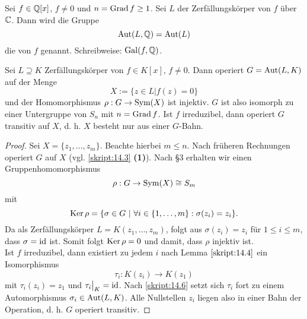 \begin{df}\label{skript:14.7}
	Sei $f\in\mathbb{Q}[x]$, $f\neq0$ und $n=\operatorname{Grad} f\geq1$. Sei $L$ der Zerfällungskörper von $f$ über $\mathbb{C}$. Dann wird die Gruppe
	\[\operatorname{Aut}(L,\mathbb{Q})=\operatorname{Aut}(L)\]
	die  von $f$ genannt. Schreibweise: $\operatorname{Gal}(f,\mathbb{Q})$.
\end{df}

\begin{sz}\label{skript:14.8}
	Sei $L\supseteq K$ Zerfällungskörper von $f\in K[x]$, $f\neq0$. Dann operiert $G=\operatorname{Aut}(L,K)$ auf der Menge
	\[X:=\{z\in L|f(z)=0\}\]
	und der Homomorphismus $\rho: G\to\operatorname{Sym}(X)$ ist injektiv. $G$ ist also isomorph zu einer Untergruppe von $S_n$ mit $n=\operatorname{Grad} f$. Ist $f$ irreduzibel, dann operiert $G$ transitiv auf $X$, d. h. $X$ besteht nur aus einer $G$-Bahn.
\end{sz}
\begin{proof}
	Sei $X=\{z_1,\ldots,z_m\}$. Beachte hierbei $m\leq n$. Nach früheren Rechnungen operiert $G$ auf $X$ (vgl. \ref{skript:14.3} \textbf{(1)}). Nach §3 erhalten wir einen Gruppenhomomorphismus
	\[\rho: G\to\operatorname{Sym}(X)\cong S_m\]
	mit
	\[\operatorname{Ker}\rho=\{\sigma\in G\ |\ \forall i\in\{1,\ldots,m\}: \sigma(z_i)=z_i\}.\]
	Da als Zerfällungskörper $L=K(z_1,\ldots,z_m)$, folgt aus $\sigma(z_i)=z_i$ für $1\leq i\leq m$, dass $\sigma=\operatorname{id}$ ist. Somit folgt $\operatorname{Ker}\rho=0$ und damit, dass $\rho$ injektiv ist.\\
	Ist $f$ irreduzibel, dann existiert zu jedem $i$ nach Lemma $\ref{skript:14.4}$ ein Isomorphismus
	\[\tau_i: K(z_i)\to K(z_1)\]
	mit $\tau_i(z_i)=z_1$ und $\tau_i\big|_K=\operatorname{id}$.
	Nach \ref{skript:14.6} setzt sich $\tau_i$ fort zu einem Automorphismus $\sigma_i\in\operatorname{Aut}(L,K)$. Alle Nullstellen $z_i$ liegen also in einer Bahn der Operation, d. h. $G$ operiert transitiv.
\end{proof}

